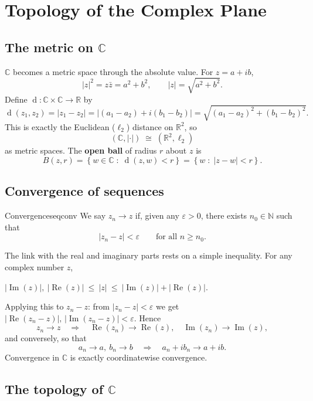 \documentclass[11pt,openany]{report}
\newcommand{\C}{\mathbb{C}}
\newcommand{\R}{\mathbb{R}}
\newcommand{\N}{\mathbb{N}}
\renewcommand{\Re}{\operatorname{Re}}
\renewcommand{\Im}{\operatorname{Im}}
\newcommand{\abs}[1]{\left\lvert #1 \right\rvert}
\newcommand{\set}[1]{\left\{ #1 \right\}}
\newcommand{\eps}{\varepsilon}
\DeclareMathOperator{\dist}{d}
\begin{document}
\chapter{Topology of the Complex Plane}

\section{The metric on \texorpdfstring{$\C$}{C}}

$\C$ becomes a metric space through the absolute value. For $z=a+ib$,
\[
  \abs{z}^2 = z\bar z = a^2+b^2, \qquad \abs{z} = \sqrt{a^2+b^2}.
\]
Define $\dist:\C\times\C\to\R$ by
\[
  \dist(z_1,z_2) = \abs{z_1-z_2}
  = \abs{(a_1-a_2)+i(b_1-b_2)}
  = \sqrt{(a_1-a_2)^2+(b_1-b_2)^2}.
\]
This is exactly the Euclidean ($\ell_2$) distance on $\R^2$, so
\[
  (\C,\abs{\cdot}) \;\cong\; (\R^2,\ell_2)
\]
as metric spaces. The \textbf{open ball} of radius $r$ about $z$ is
\[
  B(z,r) = \set{ w\in\C \;:\; \dist(z,w)<r } = \set{ w \;:\; \abs{z-w}<r }.
\]

\section{Convergence of sequences}

\begin{definition}{Convergence}{seqconv}
We say $z_n\to z$ if, given any $\eps>0$, there exists $n_0\in\N$ such that
\[
  \abs{z_n - z} < \eps \qquad \text{for all } n\ge n_0.
\]
\end{definition}

The link with the real and imaginary parts rests on a simple inequality. For any complex
number $z$,
\begin{keybox}
\centering
$\abs{\Im(z)},\ \abs{\Re(z)} \ \le\ \abs{z} \ \le\ \abs{\Im(z)} + \abs{\Re(z)}.$
\end{keybox}
Applying this to $z_n-z$: from $\abs{z_n-z}<\eps$ we get
$\abs{\Re(z_n-z)},\,\abs{\Im(z_n-z)} < \eps$. Hence
\[
  z_n\to z \quad\Longrightarrow\quad \Re(z_n)\to\Re(z),\quad \Im(z_n)\to\Im(z),
\]
and conversely, so that
\[
  a_n\to a,\ b_n\to b \quad\Longrightarrow\quad a_n+ib_n \to a+ib.
\]
Convergence in $\C$ is exactly coordinatewise convergence.

\section{The topology of \texorpdfstring{$\C$}{C}}
\end{document}
